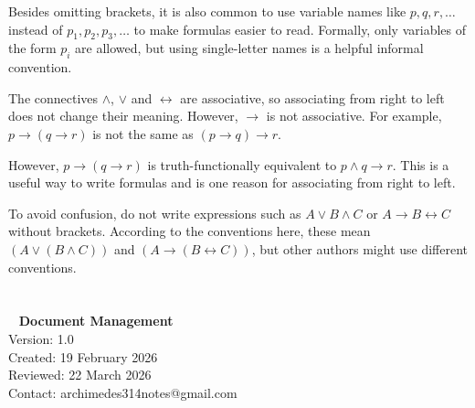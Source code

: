 \documentclass[a4paper, twoside]{article}
\newcommand{\rarrow}{\rightarrow}
\newcommand{\lorarrow}{\longrightarrow}
\newcommand{\sioi}{\leftrightarrow}
\begin{document}
Besides omitting brackets, it is also common to use variable names like \(p, q, r, \ldots\) instead of \(p_1, p_2, p_3, \ldots\) to make formulas easier to read. Formally, only variables of the form \(p_i\) are allowed, but using single-letter names is a helpful informal convention.

The connectives \(\land\), \(\lor\) and \(\sioi\) are associative, so associating from right to left does not change their meaning. However, \(\rarrow\) is not associative. For example, \(p \rarrow (q \rarrow r)\) is not the same as \((p \rarrow q) \rarrow r\).

However, \(p \rarrow (q \rarrow r)\) is truth-functionally equivalent to \(p \land q \rarrow r\). This is a useful way to write formulas and is one reason for associating from right to left.

To avoid confusion, do not write expressions such as \( A \lor B \land C\) or \(A \lorarrow B \sioi C\) without brackets. According to the conventions here, these mean \((A \lor (B \land C))\) and \((A \lorarrow (B \sioi C))\), but other authors might use different conventions.





\newpage
{}\section*{} \ \vfill
\textbf{Document Management} \\
Version: 1.0 \\
Created: 19 February 2026 \\ 
Reviewed: 22 March 2026 \\
Contact: archimedes314notes@gmail.com
\end{document}
